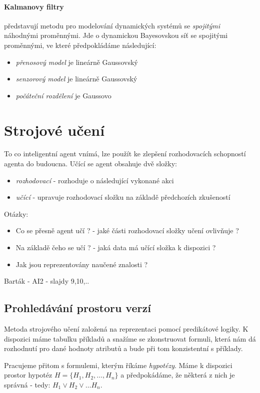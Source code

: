\documentclass[a4paper]{article}      %
\begin{document}
\paragraph{Kalmanovy filtry} představují metodu pro modelování dynamických systémů se \emph{spojitými} náhodnými proměnnými.
Jde o dynamickou Bayesovskou síť se spojitými proměnnými, ve které předpokládáme následující: 
\begin{itemize}
\item \emph{přenosový model} je lineárně Gaussovský
\item \emph{senzorový model} je lineárně Gaussovský
\item \emph{počáteční rozdělení} je Gaussovo
\end{itemize}

\section{Strojové učení}
To co inteligentní agent vnímá, lze použít ke zlepšení rozhodovacích schopností agenta do budoucna.
Učící se agent obsahuje dvě složky:
\begin{itemize}
\item \emph{rozhodovací} - rozhoduje o následující vykonané akci
\item \emph{učící} - upravuje rozhodovací složku na základě předchozích zkušeností
\end{itemize}
Otázky:
\begin{itemize}
\item Co se přesně agent učí ? - jaké části rozhodovací složky učení ovlivňuje ?
\item Na základě čeho se učí ? - jaká data má učící složka k dispozici ?
\item Jak jsou reprezentovány naučené znalosti ?
\end{itemize}
Barták - AI2 - slajdy 9,10,..

\subsection{Prohledávání prostoru verzí}
Metoda strojového učení založená na reprezentaci pomocí predikátové logiky. K dispozici máme tabulku příkladů a snažíme se zkonstruovat
formuli, která nám dá rozhodnutí pro dané hodnoty atributů a bude při tom konzistentní s příklady.

Pracujeme přitom s formulemi, kterým říkáme \emph{hypotézy}. Máme k dispozici prostor hypotéz $H = \lbrace H_1, H_2, \ldots ,H_n\rbrace$ a předpokádáme, že některá z nich je správná - tedy: $H_1 \vee H_2 \vee \ldots H_n$.
\end{document}
